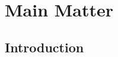\documentclass[oneside, a4paper, 12pt]{memoir}
\begin{document}
\tableofcontents
\listoffigures
\listoftables


\part*{Main Matter}
\mainmatter
\chapter{Introduction}

	

	
\end{document}
